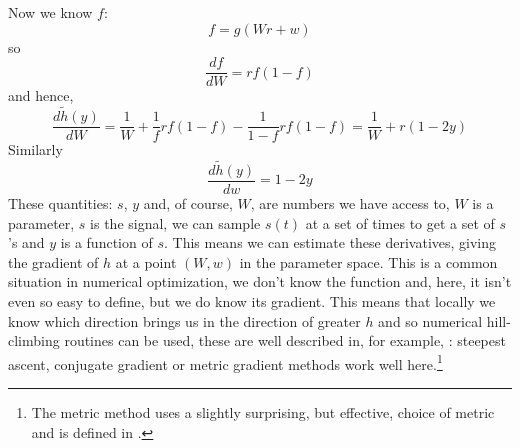 \documentclass[12pt]{article}
\begin{document}
Now we know $f$:
\begin{equation}
f=g(Wr+w)
\end{equation}
so
\begin{equation}
\frac{df}{dW}=rf(1-f)
\end{equation}
and hence, 
\begin{equation}
\frac{d\tilde{h}(y)}{dW}=\frac{1}{W}+\frac{1}{f}rf(1-f)-\frac{1}{1-f}rf(1-f)=\frac{1}{W}+r(1-2y)
\end{equation}
Similarly
\begin{equation}
\frac{d\tilde{h}(y)}{dw}=1-2y
\end{equation}
These quantities: $s$, $y$ and, of course, $W$, are numbers we have
access to, $W$ is a parameter, $s$ is the signal, we can sample $s(t)$
at a set of times to get a set of $s$'s and $y$ is a function of
$s$. This means we can estimate these derivatives, giving the gradient
of $h$ at a point $(W,w)$ in the parameter space. This is a common
situation in numerical optimization, we don't know the function and,
here, it isn't even so easy to define, but we do know its
gradient. This means that locally we know which direction brings us in
the direction of greater $h$ and so numerical hill-climbing routines
can be used, these are well described in, for example,
\cite{PressEtAl2007}: steepest ascent, conjugate gradient or metric
gradient methods work well here.\footnote{The metric method uses a
  slightly surprising, but effective, choice of metric and is defined in \cite{Amari1998}.}
\end{document}
